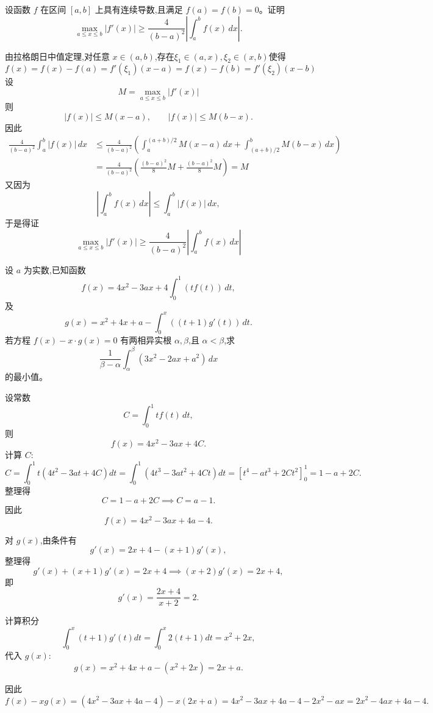\begin{questions}
    \question 设函数 $f$ 在区间 $[a,b]$ 上具有连续导数,且满足 $f(a)=f(b)=0$。证明
    \[
    \max_{a\le x\le b} |f'(x)| \ge \frac{4}{(b-a)^2}\left|\int_a^b f(x)\,dx\right|.
    \]
    \begin{solution}
        由拉格朗日中值定理,对任意 $x\in(a,b)$,存在$\xi_1\in(a,x),\xi_2\in(x,b)$使得
        \[
        f(x)=f(x)-f(a)=f'(\xi_1)(x-a)=f(x)-f(b)=f'(\xi_2)(x-b)
        \]
        设
        \[
        M=\max_{a\le x\le b}|f'(x)|
        \]
        则
        \[
        |f(x)|\le M(x-a), \qquad |f(x)|\le M(b-x).
        \]
        因此
        \begin{align*}
        \frac{4}{(b-a)^2}\int_a^b |f(x)|\,dx 
        &\le \frac{4}{(b-a)^2}
        \left(
        \int_a^{(a+b)/2} M(x-a)\,dx
        +\int_{(a+b)/2}^b M(b-x)\,dx
        \right) \\
        &= \frac{4}{(b-a)^2}
        \left(
        \frac{(b-a)^2}{8}M+\frac{(b-a)^2}{8}M
        \right)
        = M
        \end{align*}
        又因为
        \[
        \left|\int_a^b f(x)\,dx\right|\le \int_a^b |f(x)|\,dx,
        \]
        于是得证
        \[
        \max_{a\le x\le b}|f'(x)|
        \ge \frac{4}{(b-a)^2}\left|\int_a^b f(x)\,dx\right|
        \]
    \end{solution}

\question 设 $a$ 为实数,已知函数
\[
f(x) = 4x^2 - 3a x + 4 \int_0^1 (t f(t))\,dt,
\]
及
\[
g(x) = x^2 + 4x + a - \int_0^x ((t+1) g'(t))\,dt.
\]
若方程 $f(x) - x \cdot g(x) = 0$ 有两相异实根 $\alpha, \beta$,且 $\alpha < \beta$,求
\[
\frac{1}{\beta - \alpha} \int_\alpha^\beta (3x^2 - 2 a x + a^2) \, dx
\]
的最小值。

\begin{solution}
设常数
\[
C = \int_0^1 t f(t) \, dt,
\]
则
\[
f(x) = 4x^2 - 3 a x + 4 C.
\]
计算 $C$:
\[
C = \int_0^1 t (4 t^2 - 3 a t + 4 C) dt = \int_0^1 (4 t^3 - 3 a t^2 + 4 C t) dt = \left[ t^4 - a t^3 + 2 C t^2 \right]_0^1 = 1 - a + 2 C.
\]
整理得
\[
C = 1 - a + 2 C \implies C = a - 1.
\]
因此
\[
f(x) = 4 x^2 - 3 a x + 4 a - 4.
\]

对 $g(x)$,由条件有
\[
g'(x) = 2 x + 4 - (x + 1) g'(x),
\]
整理得
\[
g'(x) + (x+1) g'(x) = 2 x + 4 \implies (x + 2) g'(x) = 2 x + 4,
\]
即
\[
g'(x) = \frac{2 x + 4}{x + 2} = 2.
\]

计算积分
\[
\int_0^x (t+1) g'(t) dt = \int_0^x 2 (t+1) dt = x^2 + 2 x,
\]
代入 $g(x)$:
\[
g(x) = x^2 + 4 x + a - (x^2 + 2 x) = 2 x + a.
\]

因此
\[
f(x) - x g(x) = (4 x^2 - 3 a x + 4 a - 4) - x (2 x + a) = 4 x^2 - 3 a x + 4 a - 4 - 2 x^2 - a x = 2 x^2 - 4 a x + 4 a - 4.
\]


\end{solution}
\end{questions}
